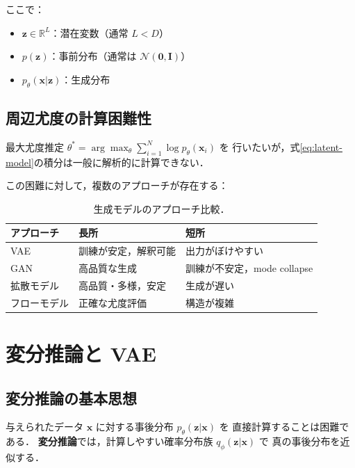 ここで：
\begin{itemize}
  \item $\boldsymbol{z} \in \mathbb{R}^L$：潜在変数（通常 $L < D$）
  \item $p(\boldsymbol{z})$：事前分布（通常は $\mathcal{N}(\mathbf{0}, \mathbf{I})$）
  \item $p_\theta(\boldsymbol{x}|\boldsymbol{z})$：生成分布
\end{itemize}

\subsection{周辺尤度の計算困難性}

最大尤度推定 $\theta^* = \arg\max_\theta \sum_{i=1}^N \log p_\theta(\boldsymbol{x}_i)$ を
行いたいが，式\eqref{eq:latent-model}の積分は一般に解析的に計算できない．

この困難に対して，複数のアプローチが存在する：

\begin{table}[hbtp]
  \centering
  \caption{生成モデルのアプローチ比較．}
  \label{tab:generative-approaches}
  \begin{tabular}{lll}
    \toprule
    アプローチ & 長所 & 短所 \\
    \midrule
    VAE & 訓練が安定，解釈可能 & 出力がぼけやすい \\
    GAN & 高品質な生成 & 訓練が不安定，mode collapse \\
    拡散モデル & 高品質・多様，安定 & 生成が遅い \\
    フローモデル & 正確な尤度評価 & 構造が複雑 \\
    \bottomrule
  \end{tabular}
\end{table}

\section{変分推論と VAE}
\label{sec:vae}

\subsection{変分推論の基本思想}

与えられたデータ $\boldsymbol{x}$ に対する事後分布 $p_\theta(\boldsymbol{z}|\boldsymbol{x})$ を
直接計算することは困難である．
\textbf{変分推論}では，計算しやすい確率分布族 $q_\phi(\boldsymbol{z}|\boldsymbol{x})$ で
真の事後分布を近似する．

